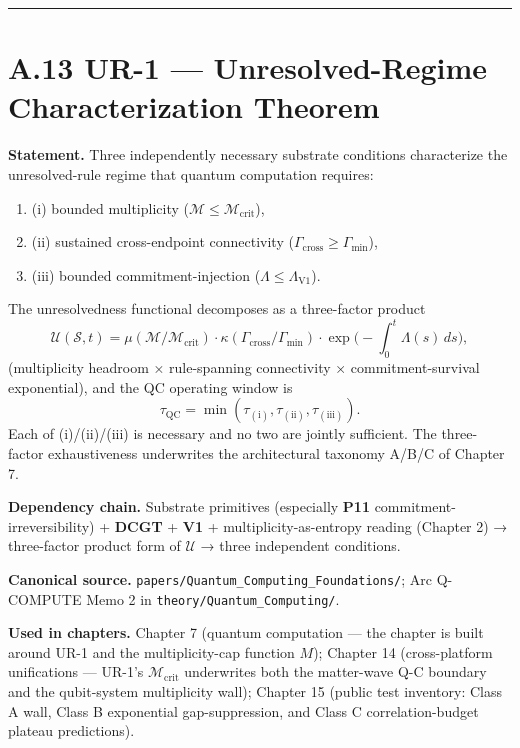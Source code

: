 \documentclass[11pt]{book}
\begin{document}
\bigskip\hrule\bigskip

\section{A.13 UR-1 — Unresolved-Regime Characterization Theorem}

\textbf{Statement.} Three independently necessary substrate conditions characterize the unresolved-rule regime that quantum computation requires:

\begin{enumerate}
\item (i) bounded multiplicity ($\mathcal{M} \leq \mathcal{M}_\mathrm{crit}$),
\item (ii) sustained cross-endpoint connectivity ($\Gamma_\mathrm{cross} \geq \Gamma_\mathrm{min}$),
\item (iii) bounded commitment-injection ($\Lambda \leq \Lambda_\mathrm{V1}$).
\end{enumerate}

The unresolvedness functional decomposes as a three-factor product
\[
\mathcal{U}(\mathcal{S},t) = \mu(\mathcal{M}/\mathcal{M}_\mathrm{crit}) \cdot \kappa(\Gamma_\mathrm{cross}/\Gamma_\mathrm{min}) \cdot \exp\!\Big(-\!\!\int_0^t \Lambda(s)\,ds\Big),
\]
(multiplicity headroom × rule-spanning connectivity × commitment-survival exponential), and the QC operating window is
\[
\tau_\mathrm{QC} = \min(\tau_{(\mathrm{i})},\tau_{(\mathrm{ii})},\tau_{(\mathrm{iii})}).
\]
Each of (i)/(ii)/(iii) is necessary and no two are jointly sufficient. The three-factor exhaustiveness underwrites the architectural taxonomy A/B/C of Chapter 7.

\textbf{Dependency chain.} Substrate primitives (especially \textbf{P11} commitment-irreversibility) + \textbf{DCGT} + \textbf{V1} + multiplicity-as-entropy reading (Chapter 2) → three-factor product form of $\mathcal{U}$ → three independent conditions.

\textbf{Canonical source.} \texttt{papers/Quantum\_Computing\_Foundations/}; Arc Q-COMPUTE Memo 2 in \texttt{theory/Quantum\_Computing/}.

\textbf{Used in chapters.} Chapter 7 (quantum computation — the chapter is built around UR-1 and the multiplicity-cap function $M$); Chapter 14 (cross-platform unifications — UR-1's $\mathcal{M}_\mathrm{crit}$ underwrites both the matter-wave Q-C boundary and the qubit-system multiplicity wall); Chapter 15 (public test inventory: Class A wall, Class B exponential gap-suppression, and Class C correlation-budget plateau predictions).
\end{document}
